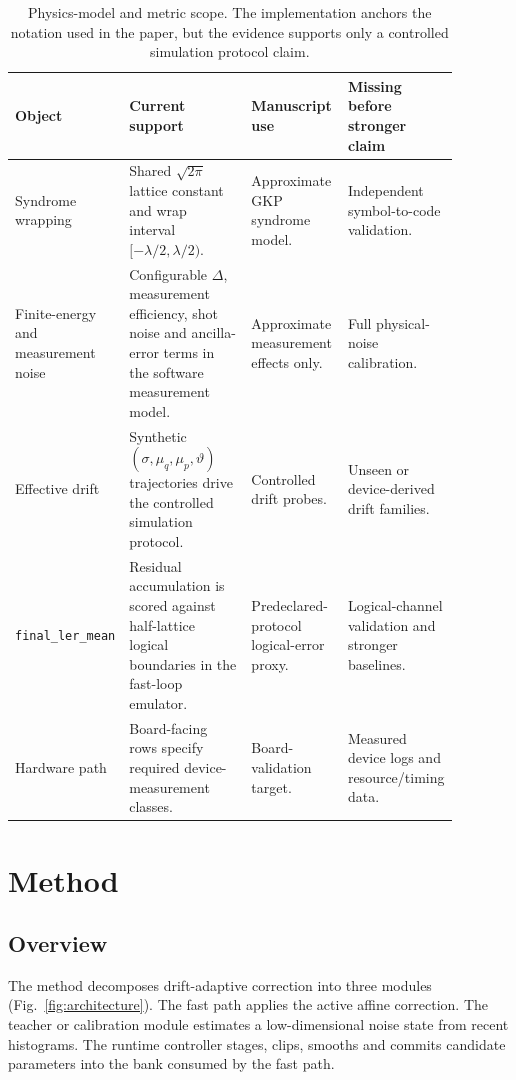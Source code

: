 \documentclass[11pt]{article}
\newcommand{\softwarehil}{controlled simulation}
\newcommand{\finalLER}{\texttt{final\_ler\_mean}}
\begin{document}
\begin{table}[htbp]
\centering
\small
\begin{tabular}{@{}>{\raggedright\arraybackslash}p{0.20\linewidth}>{\raggedright\arraybackslash}p{0.30\linewidth}>{\raggedright\arraybackslash}p{0.22\linewidth}>{\raggedright\arraybackslash}p{0.16\linewidth}@{}}
\toprule
Object & Current support & Manuscript use & Missing before stronger claim \\
\midrule
Syndrome wrapping &
Shared \(\sqrt{2\pi}\) lattice constant and wrap interval
\([-\lambda/2,\lambda/2)\). &
Approximate GKP syndrome model. &
Independent symbol-to-code validation. \\
\addlinespace
Finite-energy and measurement noise &
Configurable \(\Delta\), measurement efficiency, shot noise and ancilla-error
terms in the software measurement model. &
Approximate measurement effects only. &
Full physical-noise calibration. \\
\addlinespace
Effective drift &
Synthetic \((\sigma,\mu_q,\mu_p,\vartheta)\) trajectories drive the
\softwarehil{} protocol. &
Controlled drift probes. &
Unseen or device-derived drift families. \\
\addlinespace
\finalLER{} &
Residual accumulation is scored against half-lattice logical boundaries in the
fast-loop emulator. &
Predeclared-protocol logical-error proxy. &
Logical-channel validation and stronger baselines. \\
\addlinespace
Hardware path &
Board-facing rows specify required device-measurement classes. &
Board-validation target. &
Measured device logs and resource/timing data. \\
\bottomrule
\end{tabular}
\caption{Physics-model and metric scope.  The implementation
anchors the notation used in the paper, but the evidence supports only a
\softwarehil{} protocol claim.}
\label{tab:physics-metric-boundary}
\end{table}

\section{Method}

\subsection{Overview}

The method decomposes drift-adaptive correction into three modules
(Fig.~\ref{fig:architecture}).  The fast path applies the active affine
correction.  The teacher or calibration module estimates a low-dimensional
noise state from recent histograms.  The runtime controller stages, clips,
smooths and commits candidate parameters into the bank consumed by the fast
path.
\end{document}
